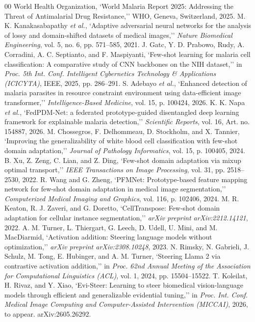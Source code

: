 \documentclass[conference]{IEEEtran}
\begin{document}
\renewcommand{\refname}{REFERENSI}
\begin{thebibliography}{00}
 World Health Organization, `World Malaria Report 2025: Addressing the Threat of Antimalarial Drug Resistance,'' WHO, Geneva, Switzerland, 2025.
 M. K. Kanakasabapathy \textit{et al.}, `Adaptive adversarial neural networks for the analysis of lossy and domain-shifted datasets of medical images,'' \textit{Nature Biomedical Engineering}, vol. 5, no. 6, pp. 571--585, 2021.
 J. Gatc, Y. D. Prabowo, Rudy, A. Corradini, A. C. Septianto, and F. Maspiyanti, `Few-shot learning for malaria cell classification: A comparative study of CNN backbones on the NIH dataset,'' in \textit{Proc. 5th Int. Conf. Intelligent Cybernetics Technology \& Applications (ICICYTA)}, IEEE, 2025, pp. 286--291.
 S. Adebayo \textit{et al.}, `Enhanced detection of malaria parasites in resource constraint environment using data-efficient image transformer,'' \textit{Intelligence-Based Medicine}, vol. 15, p. 100424, 2026.
 K. K. Napa \textit{et al.}, `FedPDM-Net: a federated prototype-guided disentangled deep learning framework for explainable malaria detection,'' \textit{Scientific Reports}, vol. 16, Art. no. 154887, 2026.
 M. Chossegros, F. Delhommeau, D. Stockholm, and X. Tannier, `Improving the generalizability of white blood cell classification with few-shot domain adaptation,'' \textit{Journal of Pathology Informatics}, vol. 15, p. 100405, 2024.
 B. Xu, Z. Zeng, C. Lian, and Z. Ding, `Few-shot domain adaptation via mixup optimal transport,'' \textit{IEEE Transactions on Image Processing}, vol. 31, pp. 2518--2530, 2022.
 R. Wang and G. Zheng, `PFMNet: Prototype-based feature mapping network for few-shot domain adaptation in medical image segmentation,'' \textit{Computerized Medical Imaging and Graphics}, vol. 116, p. 102406, 2024.
 M. R. Keaton, R. J. Zaveri, and G. Doretto, `CellTranspose: Few-shot domain adaptation for cellular instance segmentation,'' \textit{arXiv preprint arXiv:2212.14121}, 2022.
 A. M. Turner, L. Thiergart, G. Leech, D. Udell, U. Mini, and M. MacDiarmid, `Activation addition: Steering language models without optimization,'' \textit{arXiv preprint arXiv:2308.10248}, 2023.
 N. Rimsky, N. Gabrieli, J. Schulz, M. Tong, E. Hubinger, and A. M. Turner, `Steering Llama 2 via contrastive activation addition,'' in \textit{Proc. 62nd Annual Meeting of the Association for Computational Linguistics (ACL)}, vol. 1, 2024, pp. 15504--15522.
 T. Koleilat, H. Rivaz, and Y. Xiao, `Evi-Steer: Learning to steer biomedical vision-language models through efficient and generalizable evidential tuning,'' in \textit{Proc. Int. Conf. Medical Image Computing and Computer-Assisted Intervention (MICCAI)}, 2026, to appear. arXiv:2605.26292.

\end{thebibliography}
\end{document}
